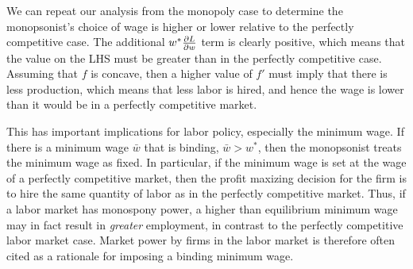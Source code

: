 We can repeat our analysis from the monopoly case to determine the monopsonist's choice of wage is higher or lower relative to the perfectly competitive case. The additional $w^* \frac{\partial L}{\partial w}$ term is clearly positive, which means that the value on the LHS must be greater than in the perfectly competitive case. Assuming that $f$ is concave, then a higher value of $f'$ must imply that there is less production, which means that less labor is hired, and hence the wage is lower than it would be in a perfectly competitive market.

This has important implications for labor policy, especially the minimum wage. If there is a minimum wage $\bar{w}$ that is binding, $\bar{w} > w^*$, then the monopsonist treats the minimum wage as fixed. In particular, if the minimum wage is set at the wage of a perfectly competitive market, then the profit maxizing decision for the firm is to hire the same quantity of labor as in the perfectly competitive market. Thus, if a labor market has monospony power, a higher than equilibrium minimum wage may in fact result in \emph{greater} employment, in contrast to the perfectly competitive labor market case. Market power by firms in the labor market is therefore often cited as a rationale for imposing a binding minimum wage.

